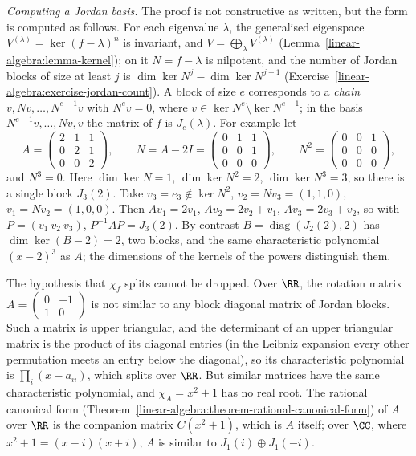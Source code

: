 \begin{example}\label{linear-algebra:example-jordan-computation}
\emph{Computing a Jordan basis.} The proof is not constructive as written, but the form is computed as follows. For each eigenvalue $\lambda$, the generalised eigenspace $V^{(\lambda)} =
\ker(f - \lambda)^n$ is invariant, and $V = \bigoplus_\lambda V^{(\lambda)}$ (Lemma~\ref{linear-algebra:lemma-kernel}); on it $N = f - \lambda$ is nilpotent, and the number of Jordan blocks of size
at least $j$ is $\dim\ker N^j - \dim\ker N^{j-1}$ (Exercise~\ref{linear-algebra:exercise-jordan-count}). A block of size $e$ corresponds to a \emph{chain} $v, Nv, \ldots, N^{e-1}v$ with
$N^ev = 0$, where $v \in \ker N^e \setminus \ker N^{e-1}$; in the basis $N^{e-1}v, \ldots, Nv, v$ the matrix of $f$ is $J_e(\lambda)$. For example let
\[
A = \begin{pmatrix}2 & 1 & 1\\ 0 & 2 & 1\\ 0 & 0 & 2\end{pmatrix}, \qquad N = A - 2I = \begin{pmatrix}0 & 1 & 1\\ 0 & 0 & 1\\ 0 & 0 & 0\end{pmatrix}, \qquad N^2 = \begin{pmatrix}0 & 0 & 1\\ 0 & 0 & 0\\ 0 & 0 & 0\end{pmatrix},
\]
and $N^3 = 0$. Here $\dim\ker N = 1$, $\dim\ker N^2 = 2$, $\dim\ker N^3 = 3$, so there is a single block $J_3(2)$. Take $v_3 = e_3 \notin \ker N^2$, $v_2 = Nv_3 = (1, 1, 0)$, $v_1 = Nv_2 = (1, 0, 0)$.
Then $Av_1 = 2v_1$, $Av_2 = 2v_2 + v_1$, $Av_3 = 2v_3 + v_2$, so with $P = (v_1\ v_2\ v_3)$, $P^{-1}AP = J_3(2)$. By contrast $B = \operatorname{diag}(J_2(2), 2)$ has $\dim\ker(B - 2) = 2$,
two blocks, and the same characteristic polynomial $(x - 2)^3$ as $A$; the dimensions of the kernels of the powers distinguish them.
\end{example}

\begin{counterexample}\label{linear-algebra:counterexample-jordan-real}
The hypothesis that $\chi_f$ splits cannot be dropped. Over $\RR$, the rotation matrix
$A = \begin{pmatrix} 0 & -1 \\ 1 & 0 \end{pmatrix}$ is not similar to any block diagonal matrix of
Jordan blocks. Such a matrix is upper triangular, and the determinant of an upper triangular
matrix is the product of its diagonal entries (in the Leibniz expansion every other permutation
meets an entry below the diagonal), so its characteristic polynomial is $\prod_i(x - a_{ii})$,
which splits over $\RR$. But similar matrices have the same characteristic polynomial, and
$\chi_A = x^2 + 1$ has no real root. The rational canonical form
(Theorem~\ref{linear-algebra:theorem-rational-canonical-form}) of $A$ over $\RR$ is the companion
matrix $C(x^2 + 1)$, which is $A$ itself; over $\CC$, where $x^2 + 1 = (x - i)(x + i)$, $A$ is
similar to $J_1(i) \oplus J_1(-i)$.
\end{counterexample}

